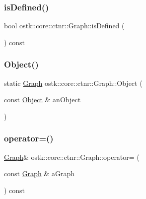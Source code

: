 \mbox{\label{classostk_1_1core_1_1ctnr_1_1_graph_ab04be03b52837bfe9deadd308271dd9a}} 
\subsubsection{\texorpdfstring{is\+Defined()}{isDefined()}}
{\footnotesize\ttfamily bool ostk\+::core\+::ctnr\+::\+Graph\+::is\+Defined (\begin{DoxyParamCaption}{ }\end{DoxyParamCaption}) const}

\mbox{\label{classostk_1_1core_1_1ctnr_1_1_graph_add4642bceba0c00fbc9e71632bf32f6b}} 
\subsubsection{\texorpdfstring{Object()}{Object()}}
{\footnotesize\ttfamily static \hyperlink{classostk_1_1core_1_1ctnr_1_1_graph}{Graph} ostk\+::core\+::ctnr\+::\+Graph\+::\+Object (\begin{DoxyParamCaption}\item[{const \hyperlink{classostk_1_1core_1_1ctnr_1_1_object}{Object} \&}]{an\+Object }\end{DoxyParamCaption})\hspace{0.3cm}{\ttfamily [static]}}

\mbox{\label{classostk_1_1core_1_1ctnr_1_1_graph_a86ab35adfdfea54ae330e8a15afbb18b}} 
\subsubsection{\texorpdfstring{operator=()}{operator=()}}
{\footnotesize\ttfamily \hyperlink{classostk_1_1core_1_1ctnr_1_1_graph}{Graph}\& ostk\+::core\+::ctnr\+::\+Graph\+::operator= (\begin{DoxyParamCaption}\item[{const \hyperlink{classostk_1_1core_1_1ctnr_1_1_graph}{Graph} \&}]{a\+Graph }\end{DoxyParamCaption}) const}



